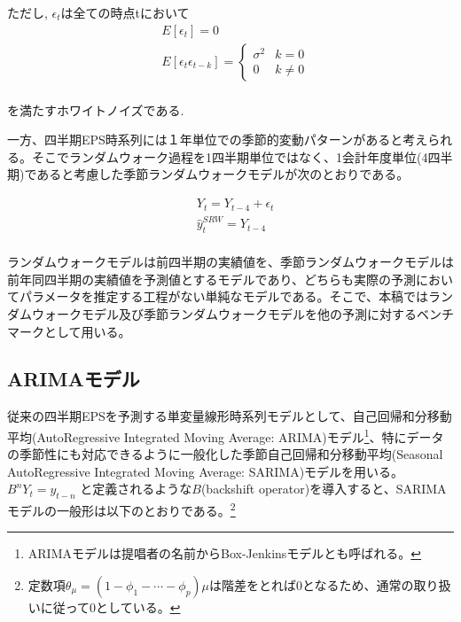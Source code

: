 \documentclass[a4paper, 12pt]{jsarticle}
\begin{document}
ただし, $\epsilon_t$は全ての時点tにおいて
\begin{equation}
  \begin{split}
    & E[\epsilon_t] = 0 \\
    & E[\epsilon_t \epsilon_{t-k}] = \left\{
      \begin{array}{ll}
        \sigma^2 & k=0 \\
        0 & k \neq 0
      \end{array}\right. \\
  \end{split}
\end{equation}    

を満たすホワイトノイズである.

一方、四半期EPS時系列には１年単位での季節的変動パターンがあると考えられる。そこでランダムウォーク過程を1四半期単位ではなく、1会計年度単位(4四半期)であると考慮した季節ランダムウォークモデルが次のとおりである。

\begin{equation}
  \begin{split}
    & Y_t = Y_{t-4} + \epsilon_t \\
    & \hat{y}_t^{SRW} = Y_{t-4} \\
  \end{split}
\end{equation} 

ランダムウォークモデルは前四半期の実績値を、季節ランダムウォークモデルは前年同四半期の実績値を予測値とするモデルであり、どちらも実際の予測においてパラメータを推定する工程がない単純なモデルである。そこで、本稿ではランダムウォークモデル及び季節ランダムウォークモデルを他の予測に対するベンチマークとして用いる。

\subsection{ARIMAモデル}

従来の四半期EPSを予測する単変量線形時系列モデルとして、自己回帰和分移動平均(AutoRegressive Integrated Moving Average: ARIMA)モデル\citep{box2015time}\footnote{ARIMAモデルは提唱者の名前からBox-Jenkinsモデルとも呼ばれる。}、特にデータの季節性にも対応できるように一般化した季節自己回帰和分移動平均(Seasonal AutoRegressive Integrated Moving Average: SARIMA)モデルを用いる。$B^nY_t = y_{t-n}$ と定義されるような$B$(backshift operator)を導入すると、SARIMAモデルの一般形は以下のとおりである。\footnote{定数項$\theta_{\mu}=(1-\phi_1-\cdots-\phi_p)\mu$は階差をとれば0となるため、通常の取り扱いに従って0としている。}
\end{document}
